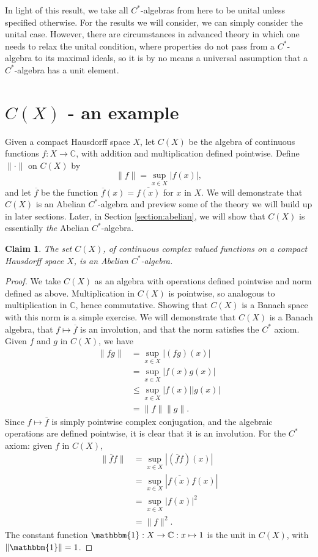 \documentclass[12pt,a4paper]{report}
\theoremstyle{plain}
\newtheorem*{claim}{Claim}
\theoremstyle{definition}
\newcommand{\1}{\mathbbm{1}}
\newcommand{\C}{\mathbb{C}}
\newcommand{\CX}{C(X)}
\renewcommand{\bar}{\overline}
\begin{document}
In light of this result, we take all $C^\ast$-algebras from here to be unital unless
specified otherwise. For the results we will consider, we can simply consider the unital case. 
However, there are circumstances in advanced theory in which one needs to relax the unital 
condition, where properties do not pass from a $C^\ast$-algebra to its maximal ideals, so it is by no 
means a universal assumption that a $C^\ast$-algebra has a unit element.


\section{$\CX$ - an example} \label{section:CX}
Given a compact Hausdorff space $X$, let $\CX$ be the algebra of continuous functions
$f:X\to\C$, with addition and multiplication defined pointwise. Define $\|\cdot\|$ on $\CX$ by
\[
	\|f\|= \sup_{x\in X}{|f(x)|},
\]
and let $\overline f$ be the function $\overline f(x) = \overline{f(x)}$ for $x$ in $X$.
We will demonstrate that $\CX$ is an Abelian $C^\ast$-algebra and preview some of the theory
we will build up in later sections. Later, in Section \ref{section:abelian}, we will show that $\CX$ is 
essentially \emph{the} Abelian $C^\ast$-algebra.

\begin{claim}
	The set $\CX$, of continuous complex valued functions on a compact Hausdorff space $X$, is an 
	Abelian $C^\ast$-algebra.
\end{claim}
\begin{proof}
	We take $\CX$ as an algebra with operations defined pointwise and norm defined as above.
	Multiplication in $\CX$ is pointwise, so analogous to multiplication in $\C$, hence commutative.
	Showing that $\CX$ is a Banach space with this norm is a simple exercise. We will demonstrate that $
	\CX$ is a Banach algebra, that $f\mapsto\overline{f}$ is an involution, and that the norm satisfies 
	the $C^\ast$ axiom.
	Given $f$ and $g$ in $\CX$, we have 
	\begin{align*}
				\|fg\| 
		&= 		\sup_{x\in X}|(fg)(x)|											\\
		&= 		\sup_{x\in X}|f(x)g(x)|											\\
		&\leq	\sup_{x\in X}|f(x)||g(x)|										\\
		&=		\|f\|\|g\|.
	\end{align*}
	Since $f\mapsto\overline{f}$ is simply pointwise complex conjugation, and the algebraic operations are defined pointwise, it is clear that it is an involution. For the $C^\ast$ axiom: given $f$ in $\CX$,
	\begin{align*}
				\|\bar f f\| 
		&= 		\sup_{x\in X}|(\bar f f)(x)|									\\
		&= 		\sup_{x\in X}|\bar{f(x)} f(x)|									\\
		&=		\sup_{x\in X}|f(x)|^2											\\
		&=		\|f\|^2.
	\end{align*}
	The constant function $\1:X\to\C:x\mapsto 1$ is the unit in $\CX$, with $\|\1\| = 1$.
\end{proof}
\end{document}
